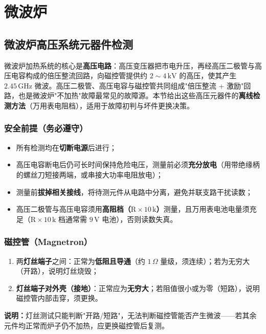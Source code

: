 \documentclass[12pt,a4paper]{ctexbook}
\begin{document}
\chapter{微波炉}

\section{微波炉高压系统元器件检测}
\label{sec:mw_oven_hv_components}

微波炉加热系统的核心是\textbf{高压电路}：高压变压器把市电升压，再经高压二极管与高压电容构成的倍压整流回路，向磁控管提供约 $2\sim4\,\mathrm{kV}$ 的高压，使其产生 $2.45\,\mathrm{GHz}$ 微波。高压二极管、高压电容与磁控管共同组成"倍压整流 + 激励"回路，也是微波炉"不加热"故障最常见的故障源。本节给出这些高压元器件的\textbf{离线检测方法}（万用表电阻档），适用于故障初判与坏件更换决策。

\subsection*{安全前提（务必遵守）}
\begin{itemize}
  \item 所有检测均在\textbf{切断电源}后进行；
  \item 高压电容断电后仍可长时间保持危险电压，测量前必须\textbf{充分放电}（用带绝缘柄的螺丝刀短接两端，或串接大功率电阻放电）；
  \item 测量前\textbf{拔掉相关接线}，将待测元件从电路中分离，避免并联支路干扰读数；
  \item 高压二极管与高压电容须用\textbf{高阻档（$\mathrm{R}\times10\,\mathrm{k}$）}测量，且万用表电池电量须充足（$\mathrm{R}\times10\,\mathrm{k}$ 档通常需 $9\,\mathrm{V}$ 电池），否则读数失真。
\end{itemize}

\subsection{磁控管（Magnetron）}
\begin{enumerate}
  \item 两\textbf{灯丝端子}之间：正常为\textbf{低阻且导通}（约 $1\,\Omega$ 量级，须连续）；若为无穷大（开路），说明灯丝烧毁；
  \item \textbf{灯丝端子对外壳（接地）}：正常应为\textbf{无穷大}；若阻值很小或为零（短路），说明磁控管内部击穿，须更换。
\end{enumerate}
\textbf{说明：}灯丝测试只能判断"开路/短路"，无法判断磁控管能否产生微波——若其余元件均正常而炉子仍不加热，应更换磁控管后复测。
\end{document}
